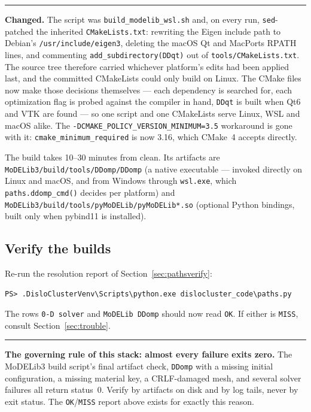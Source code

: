 \documentclass[11pt]{article}
\newcommand{\MoD}{\textsf{MoDELib3}}
\newcommand{\code}[1]{\texttt{\small #1}}
\newcommand{\file}[1]{\texttt{\footnotesize #1}}
\newenvironment{warnbox}
  {\par\medskip\noindent
   \begin{minipage}{\textwidth}
   {\color{red!60!black}\rule{\textwidth}{0.8pt}}\par\smallskip
   \small\noindent{\color{red!60!black}\textbf{Warning.}}\space}
  {\par\smallskip\noindent{\color{red!60!black}\rule{\textwidth}{0.8pt}}
   \end{minipage}\par\medskip}
\newenvironment{notebox}
  {\par\medskip\noindent
   \begin{minipage}{\textwidth}
   {\color{blue!50!black}\rule{\textwidth}{0.8pt}}\par\smallskip
   \small\noindent{\color{blue!50!black}\textbf{Note.}}\space}
  {\par\smallskip\noindent{\color{blue!50!black}\rule{\textwidth}{0.8pt}}
   \end{minipage}\par\medskip}
\begin{document}
\begin{notebox}
\textbf{Changed.} The script was \file{build\_modelib\_wsl.sh} and, on every
run, \code{sed}-patched the inherited \file{CMakeLists.txt}: rewriting the
Eigen include path to Debian's \file{/usr/include/eigen3}, deleting the macOS
Qt and MacPorts RPATH lines, and commenting \code{add\_subdirectory(DDqt)} out
of \file{tools/CMakeLists.txt}. The source tree therefore carried whichever
platform's edits had been applied last, and the committed CMakeLists could
only build on Linux. The CMake files now make those decisions themselves ---
each dependency is searched for, each optimization flag is probed against the
compiler in hand, \code{DDqt} is built when Qt6 and VTK are found --- so one
script and one CMakeLists serve Linux, WSL and macOS alike. The
\code{-DCMAKE\_POLICY\_VERSION\_MINIMUM=3.5} workaround is gone with it:
\code{cmake\_minimum\_required} is now 3.16, which CMake~4 accepts directly.
\end{notebox}

The build takes 10--30 minutes from clean. Its artifacts are
\file{MoDELib3/build/tools/\allowbreak DDomp/DDomp} (a native executable ---
invoked directly on Linux and macOS, and from Windows through \code{wsl.exe},
which \code{paths.ddomp\_cmd()} decides per platform) and
\file{MoDELib3/build/tools/\allowbreak pyMoDELib/pyMoDELib*.so} (optional
Python bindings, built only when pybind11 is installed).

\subsection{Verify the builds}

Re-run the resolution report of Section~\ref{sec:pathsverify}:

\begin{lstlisting}[style=ps]
PS> .DisloClusterVenv\Scripts\python.exe dislocluster_code\paths.py
\end{lstlisting}

The rows \code{0-D solver} and \code{MoDELib DDomp} should now read
\code{OK}. If either is \code{MISS}, consult Section~\ref{sec:trouble}.

\begin{warnbox}
\textbf{The governing rule of this stack: almost every failure exits zero.}
The \MoD{} build script's final artifact check, \code{DDomp} with a missing
initial configuration, a missing material key, a CRLF-damaged mesh, and
several solver failures all return status~0. Verify by artifacts on disk and
by log tails, never by exit status. The \code{OK}/\code{MISS} report above
exists for exactly this reason.
\end{warnbox}
\end{document}
